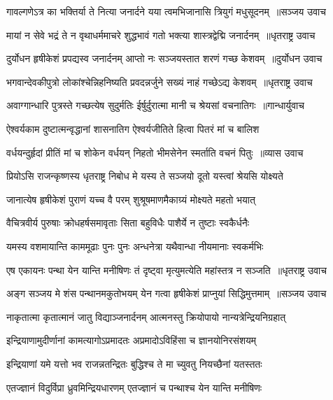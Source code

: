 \threelineshloka
{गावल्गणेऽत्र का भक्तिर्या ते नित्या जनार्दने}
{यया त्वमभिजानासि त्रियुगं मधुसूदनम् ॥सञ्जय उवाच}
{}


\threelineshloka
{मायां न सेवे भद्रं ते न वृथाधर्ममाचरे}
{शुद्धभावं गतो भक्त्या शास्त्रद्वेद्मि जनार्दनम् ॥धृतराष्ट्र उवाच}
{}


\threelineshloka
{दुर्योधन हृषीकेशं प्रपद्यस्व जनार्दनम्}
{आप्तो नः सञ्जयस्तात शरणं गच्छ केशवम् ॥दुर्योधन उवाच}
{}


\threelineshloka
{भगवान्देवकीपुत्रो लोकांश्चेन्निहनिष्यति}
{प्रवदन्नर्जुने सख्यं नाहं गच्छेऽद्य केशवम् ॥धृतराष्ट्र उवाच}
{}


\threelineshloka
{अवाग्गान्धारि पुत्रस्ते गच्छत्येष सुदुर्मतिः}
{ईर्षुर्दुरात्मा मानी च श्रेयसां वचनातिगः ॥गान्धार्युवाच}
{}


\twolineshloka
{ऐश्वर्यकाम दुष्टात्मन्वृद्धानां शासनातिग}
{ऐश्वर्यजीतिते हित्वा पितरं मां च बालिश}


\threelineshloka
{वर्धयन्दुर्हृदां प्रीतिं मां च शोकेन वर्धयन्}
{निहतो भीमसेनेन स्मर्ताति वचनं पितुः ॥व्यास उवाच}
{}


\twolineshloka
{प्रियोऽसि राजन्कृष्णस्य धृतराष्ट्र निबोध मे}
{यस्य ते सञ्जयो दूतो यस्त्वां श्रेयसि योक्ष्यते}


\twolineshloka
{जानात्येष हृषीकेशं पुराणं यच्च वै परम्}
{शुश्रूषमाणमैकाग्र्यं मोक्ष्यते महतो भयात्}


\twolineshloka
{वैचित्रवीर्य पुरुषाः क्रोधहर्षसमावृताः}
{सिता बहुविधैः पाशैर्ये न तुष्टाः स्वकैर्धनैः}


\twolineshloka
{यमस्य वशमायान्ति काममूढाः पुनः पुनः}
{अन्धनेत्रा यथैवान्धा नीयमानाः स्वकर्मभिः}


\threelineshloka
{एष एकायनः पन्था येन यान्ति मनीषिणः}
{तं दृष्ट्वा मृत्युमत्येति महांस्तत्र न सञ्जति ॥धृतराष्ट्र उवाच}
{}


\threelineshloka
{अङ्ग सञ्जय मे शंस पन्थानमकुतोभयम्}
{येन गत्वा हृषीकेशं प्राप्नुयां सिद्धिमुत्तमाम् ॥सञ्जय उवाच}
{}


\twolineshloka
{नाकृतात्मा कृतात्मानं जातु विद्याञ्जनार्दनम्}
{आत्मनस्तु क्रियोपायो नान्यत्रेन्द्रियनिग्रहात्}


\twolineshloka
{इन्द्रियाणामुदीर्णानां कामत्यागोऽप्रमादतः}
{अप्रमादोऽविहिंसा च ज्ञानयोनिरसंशयम्}


\twolineshloka
{इन्द्रियाणां यमे यत्तो भव राजन्नतन्द्रितः}
{बुद्धिश्च ते मा च्युवतु नियच्छैनां यतस्ततः}


\twolineshloka
{एतज्ज्ञानं विदुर्विप्रा ध्रुवमिन्द्रियधारणम्}
{एतज्ज्ञानं च पन्थाश्च येन यान्ति मनीषिणः}


